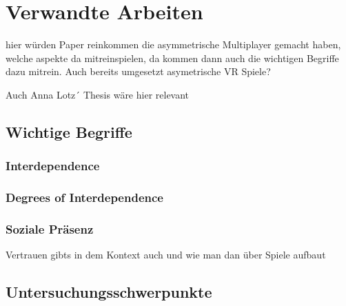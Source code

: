 \chapter{Verwandte Arbeiten}

\cite{harris_asymmetry_2019}
\cite{sajjadi_maze_2014}

hier würden Paper reinkommen die asymmetrische Multiplayer gemacht haben, welche aspekte da mitreinspielen, da kommen dann auch die wichtigen Begriffe dazu mitrein. Auch bereits umgesetzt asymetrische VR Spiele?


Auch Anna Lotz´ Thesis wäre hier relevant


\section{Wichtige Begriffe}

\subsection{Interdependence}
\cite{harris_leveraging_2016}
\cite{depping_cooperation_2017}

\subsection{Degrees of Interdependence}
\cite{beznosyk_effect_2012}

\subsection{Soziale Präsenz}

Vertrauen gibts in dem Kontext auch und wie man dan über Spiele aufbaut

\section{Untersuchungsschwerpunkte}